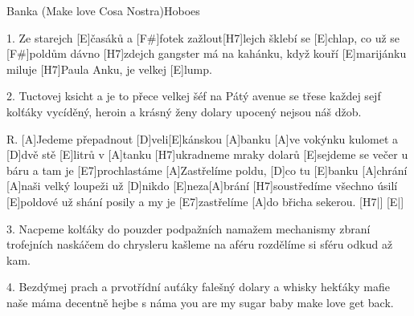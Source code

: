 \begin{song}{Banka (Make love Cosa Nostra)}{Hoboes}


\begin{xverse}{1. }
Ze starejch [E]{}časáků a [F#]fotek zažlout[H7]lejch
šklebí se [E]chlap, co už se [F#]poldům dávno [H7]zdejch
gangster má na kahánku, když kouří [E]marijánku
miluje [H7]Paula Anku, je velkej [E]lump.
\end{xverse}

\begin{xverse}{2. }
Tuctovej ksicht a je to přece velkej šéf
na Pátý avenue se třese každej sejf
kolťáky vycíděný, heroin a krásný ženy
dolary upocený nejsou náš džob.
\end{xverse}

\begin{xverse}{R. }
[A]Jedeme přepadnout [D]veli[E]kánskou [A]banku
[A]ve vokýnku kulomet a [D]dvě stě [E]litrů v [A]tanku
[H7]ukradneme mraky dolarů
[E]sejdeme se večer u báru a tam je [E7]prochlastáme
[A]Zastřelíme poldu, [D]co tu [E]banku [A]chrání
[A]naši velký loupeži už [D]nikdo [E]neza[A]brání
[H7]soustředíme všechno úsilí
[E]poldové už shání posily a my je [E7]zastřelíme
[A]do břicha sekerou. [H7|]{} [E|]{}
\end{xverse}


\begin{xverse}{3. }
Nacpeme kolťáky do pouzder podpažních
namažem mechanismy zbraní trofejních
naskáčem do chrysleru kašleme na aféru
rozdělíme si sféru odkud až kam.
\end{xverse}


\begin{xverse}{4. }
Bezdýmej prach a prvotřídní auťáky
falešný dolary a whisky hekťáky
mafie naše máma decentně hejbe s náma
you are my sugar baby make love get back.
\end{xverse}


\end{song}

